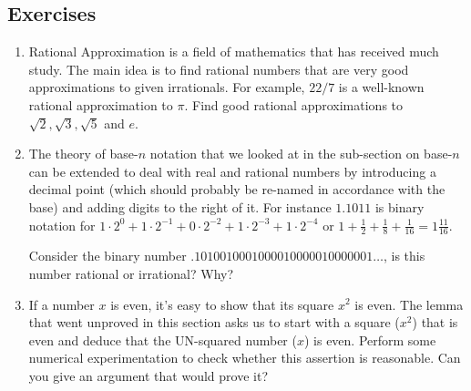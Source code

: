 \documentclass[10pt,]{book}
\theoremstyle{plain}
\theoremstyle{definition}
\theoremstyle{definition}
\numberwithin{equation}{section}
\newcommand{\hint}[1]{ }
\begin{document}
\subsection[{Exercises}]{Exercises}\label{exercises-6}
\leavevmode%
\begin{enumerate}[label=(\alph*)]
\item\hypertarget{li-95}{}
           Rational Approximation is 
          a field of mathematics that has received much study.  The main idea 
          is to find rational numbers that are very good approximations to
          given irrationals.  For example, \(22/7\) is a well-known rational 
          approximation to \(\pi\).  Find good rational approximations to 
          \(\sqrt{2}, \sqrt{3}, \sqrt{5}\) and \(e\).





          \hint{One approach is to truncate a decimal approximation and then rationalize. E.g. \(\sqrt{2}\) is approximately 1.4142, so 14142/10000 isn't a bad approximator (although naturally 7071/5000 is better since it involves smaller numbers).}
\item\hypertarget{li-96}{}
          The theory of base-\(n\) notation that we looked at in 
          the sub-section on base-\(n\)  can be extended to deal with real and 
          rational numbers by introducing a decimal point (which should 
          probably be re-named in accordance with the base) and adding 
          digits to the right of it.  For instance \(1.1011\) is binary notation
          for \(1 \cdot 2^0 + 1 \cdot 2^{-1} + 0 \cdot 2^{-2} + 
          1\cdot 2^{-3} + 1\cdot 2^{-4}\) or \(\displaystyle 1 + \frac{1}{2} + 
          \frac{1}{8} + \frac{1}{16} = 1 \frac{11}{16}\).

          Consider the binary number \(.1010010001000010000010000001\ldots\), 
          is this number rational or irrational?  Why?



          \hint{Does the rule about rational numbers having terminating or repeating decimal representations carry over to other bases?



          }
\item\hypertarget{li-97}{}
          If a number \(x\) is even, it's easy to show that its square \(x^2\)
          is even.  The lemma that went unproved in this section asks us to
          start with a square (\(x^2\)) that is even and deduce that the UN-squared
          number (\(x\)) is even.  Perform some numerical experimentation to
          check whether this assertion is reasonable.  Can you give an argument
          that would prove it?




\end{enumerate}
\end{document}

